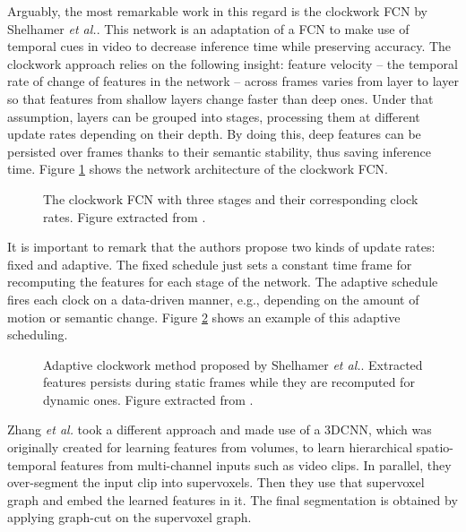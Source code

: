 Arguably, the most remarkable work in this regard is the clockwork \ac{FCN} by Shelhamer \emph{et al.}\cite{Shelhamer2016}. This network is an adaptation of a \ac{FCN} to make use of temporal cues in video to decrease inference time while preserving accuracy. The clockwork approach relies on the following insight: feature velocity -- the temporal rate of change of features in the network -- across frames varies from layer to layer so that features from shallow layers change faster than deep ones. Under that assumption, layers can be grouped into stages, processing them at different update rates depending on their depth. By doing this, deep features can be persisted over frames thanks to their semantic stability, thus saving inference time. Figure \ref{fig:clockworkfcn} shows the network architecture of the clockwork \ac{FCN}.

\begin{figure}[!hbt]
	\centering
	\caption{The clockwork \acs{FCN} with three stages and their corresponding clock rates. Figure extracted from \cite{Shelhamer2016}.}
	\label{fig:clockworkfcn}
\end{figure}

It is important to remark that the authors propose two kinds of update rates: fixed and adaptive. The fixed schedule just sets a constant time frame for recomputing the features for each stage of the network. The adaptive schedule fires each clock on a data-driven manner, e.g., depending on the amount of motion or semantic change. Figure \ref{fig:clockworkfcn-adaptive} shows an example of this adaptive scheduling.

\begin{figure}[!hbt]
	\centering
	\caption{Adaptive clockwork method proposed by Shelhamer \emph{et al.}\cite{Shelhamer2016}. Extracted features persists during static frames while they are recomputed for dynamic ones. Figure extracted from \cite{Shelhamer2016}.}
	\label{fig:clockworkfcn-adaptive}
\end{figure}

Zhang \emph{et al.}\cite{Zhang2014} took a different approach and made use of a \acs{3D}\acs{CNN}, which was originally created for learning features from volumes, to learn hierarchical spatio-temporal features from multi-channel inputs such as video clips. In parallel, they over-segment the input clip into supervoxels. Then they use that supervoxel graph and embed the learned features in it. The final segmentation is obtained by applying graph-cut\cite{Boykov2001} on the supervoxel graph.

